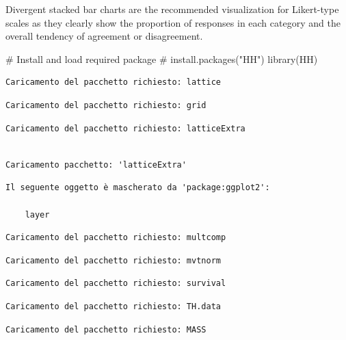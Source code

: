 \documentclass[
  letterpaper,
  DIV=11,
  numbers=noendperiod]{scrartcl}
\newenvironment{Shaded}{\begin{snugshade}}{\end{snugshade}}
\newcommand{\CommentTok}[1]{\textcolor[rgb]{0.37,0.37,0.37}{#1}}
\newcommand{\FunctionTok}[1]{\textcolor[rgb]{0.28,0.35,0.67}{#1}}
\newcommand{\NormalTok}[1]{\textcolor[rgb]{0.00,0.23,0.31}{#1}}
\begin{document}
Divergent stacked bar charts are the recommended visualization for
Likert-type scales as they clearly show the proportion of responses in
each category and the overall tendency of agreement or disagreement.

\begin{Shaded}
\begin{Highlighting}[]
\CommentTok{\# Install and load required package}
\CommentTok{\# install.packages("HH")}
\FunctionTok{library}\NormalTok{(HH)}
\end{Highlighting}
\end{Shaded}

\begin{verbatim}
Caricamento del pacchetto richiesto: lattice
\end{verbatim}

\begin{verbatim}
Caricamento del pacchetto richiesto: grid
\end{verbatim}

\begin{verbatim}
Caricamento del pacchetto richiesto: latticeExtra
\end{verbatim}

\begin{verbatim}

Caricamento pacchetto: 'latticeExtra'
\end{verbatim}

\begin{verbatim}
Il seguente oggetto è mascherato da 'package:ggplot2':

    layer
\end{verbatim}

\begin{verbatim}
Caricamento del pacchetto richiesto: multcomp
\end{verbatim}

\begin{verbatim}
Caricamento del pacchetto richiesto: mvtnorm
\end{verbatim}

\begin{verbatim}
Caricamento del pacchetto richiesto: survival
\end{verbatim}

\begin{verbatim}
Caricamento del pacchetto richiesto: TH.data
\end{verbatim}

\begin{verbatim}
Caricamento del pacchetto richiesto: MASS
\end{verbatim}
\end{document}
